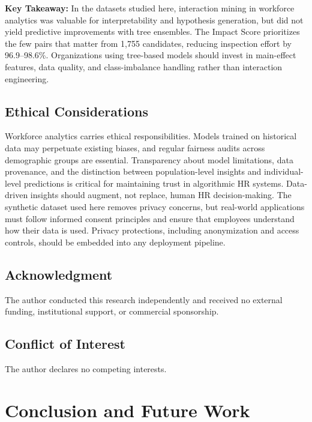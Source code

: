 \documentclass[conference]{IEEEtran}
\newcounter{algorithm}
\begin{document}
\noindent\textbf{Key Takeaway:} In the datasets studied here, interaction mining in workforce analytics was valuable for interpretability and hypothesis generation, but did not yield predictive improvements with tree ensembles. The Impact Score prioritizes the few pairs that matter from 1,755 candidates, reducing inspection effort by 96.9--98.6\%. Organizations using tree-based models should invest in main-effect features, data quality, and class-imbalance handling rather than interaction engineering.

\subsection{Ethical Considerations}

Workforce analytics carries ethical responsibilities. Models trained on historical data may perpetuate existing biases, and regular fairness audits across demographic groups are essential. Transparency about model limitations, data provenance, and the distinction between population-level insights and individual-level predictions is critical for maintaining trust in algorithmic HR systems. Data-driven insights should augment, not replace, human HR decision-making. The synthetic dataset used here removes privacy concerns, but real-world applications must follow informed consent principles and ensure that employees understand how their data is used. Privacy protections, including anonymization and access controls, should be embedded into any deployment pipeline.

\subsection*{Acknowledgment}
The author conducted this research independently and received no external funding, institutional support, or commercial sponsorship.

\subsection*{Conflict of Interest}
The author declares no competing interests.

\section{Conclusion and Future Work}
\label{sec:conclusion}
\end{document}
